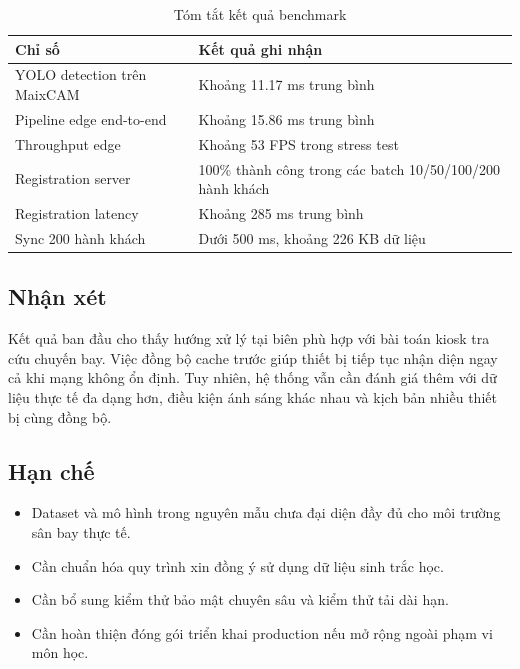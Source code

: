 \begin{table}[H]
  \centering
  \caption{Tóm tắt kết quả benchmark}
  \begin{tabularx}{\textwidth}{lX}
    \toprule
    \textbf{Chỉ số} & \textbf{Kết quả ghi nhận} \\
    \midrule
    YOLO detection trên MaixCAM & Khoảng 11.17 ms trung bình \\
    Pipeline edge end-to-end & Khoảng 15.86 ms trung bình \\
    Throughput edge & Khoảng 53 FPS trong stress test \\
    Registration server & 100\% thành công trong các batch 10/50/100/200 hành khách \\
    Registration latency & Khoảng 285 ms trung bình \\
    Sync 200 hành khách & Dưới 500 ms, khoảng 226 KB dữ liệu \\
    \bottomrule
  \end{tabularx}
\end{table}

\subsection{Nhận xét}
Kết quả ban đầu cho thấy hướng xử lý tại biên phù hợp với bài toán kiosk tra cứu chuyến bay. Việc đồng bộ cache trước giúp thiết bị tiếp tục nhận diện ngay cả khi mạng không ổn định. Tuy nhiên, hệ thống vẫn cần đánh giá thêm với dữ liệu thực tế đa dạng hơn, điều kiện ánh sáng khác nhau và kịch bản nhiều thiết bị cùng đồng bộ.

\subsection{Hạn chế}
\begin{itemize}
  \item Dataset và mô hình trong nguyên mẫu chưa đại diện đầy đủ cho môi trường sân bay thực tế.
  \item Cần chuẩn hóa quy trình xin đồng ý sử dụng dữ liệu sinh trắc học.
  \item Cần bổ sung kiểm thử bảo mật chuyên sâu và kiểm thử tải dài hạn.
  \item Cần hoàn thiện đóng gói triển khai production nếu mở rộng ngoài phạm vi môn học.
\end{itemize}

